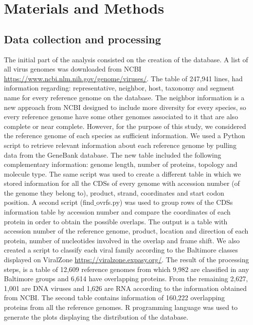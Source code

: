 \documentclass[12pt]{article}
\begin{document}
\section{Materials and Methods}
\subsection{Data collection and processing}
The initial part of the analysis consisted on the creation of the database.
A list of all virus genomes was downloaded from NCBI \url{https://www.ncbi.nlm.nih.gov/genome/viruses/}.
The table of 247,941 lines, had information regarding: representative, neighbor, host, taxonomy and segment name for every reference genome on the database. 
The neighbor information is a new approach from NCBI designed to include more diversity for every species, so every reference genome have some other genomes associated to it that are also complete or near complete. 
However, for the purpose of this study, we considered the reference genome of each species as sufficient information. 
We used a Python script to retrieve relevant information about each reference genome by pulling data from the GeneBank database. 
The new table included the following complementary information: genome length, number of proteins, topology and molecule type.
The same script was used to create a different table in which we stored information for all the CDSs of every genome with accession number (of the genome they belong to), product, strand, coordinates and start codon position. 
A second script (find$\_$ovrfs.py) was used to group rows of the CDSs information table by accession number and compare the coordinates of each protein in order to obtain the possible overlaps. 
The output is a table with accession number of the reference genome, product, location and direction of each protein, number of nucleotides involved in the overlap and frame shift.
We also created a script to classify each viral family according to the Baltimore classes displayed on ViralZone \url{https://viralzone.expasy.org/}.
The result of the processing steps, is a table of 12,609 reference genomes from which 9,982 are classified in any Baltimore groups and 6,614 have overlapping proteins. 
From the remaining 2,627, 1,001 are DNA viruses and 1,626 are RNA according to the information obtained from NCBI.
The second table contains information of 160,222 overlapping proteins from all the reference genomes.
R programming language was used to generate the plots displaying the distribution of the database.
\end{document}
